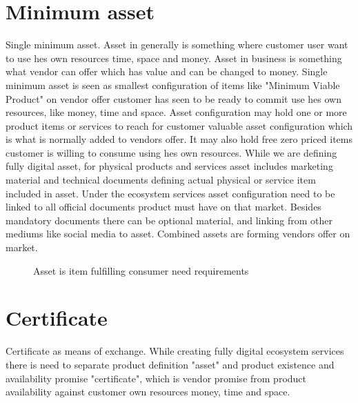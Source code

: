 \section{Minimum asset}
\label{minimum_asset}
Single minimum asset.
Asset in generally is something where customer user want to use hes own resources time, space and money. Asset in business is something what vendor can offer which has value and can be changed to money. Single minimum asset is seen as smallest configuration of items like "Minimum Viable Product" on vendor offer customer has seen to be ready to commit use hes own resources, like money, time and space. Asset configuration may hold one or more product items or services to reach for customer valuable asset configuration which is what is normally added to vendors offer. It may also hold free zero priced items customer is willing to consume using hes own resources. While we are defining fully digital asset, for physical products and services asset includes marketing material and technical documents defining actual physical or service item included in asset. Under the ecosystem services asset configuration need to be linked to all official documents product must have on that market. Besides mandatory documents there can be optional material, and linking from other mediums like social media to asset. Combined assets are forming vendors offer on market.

\begin{figure} %
 \begin{center}
  \caption{Asset is item fulfilling consumer need requirements}
  \label{fig:asset}
 \end{center}
\end{figure}


\section{Certificate}
\label{certificate}
Certificate as means of exchange.
While creating fully digital ecosystem services there is need to separate product definition "asset" and product existence and availability promise "certificate", which is vendor promise from product availability against customer own resources money, time and space.

